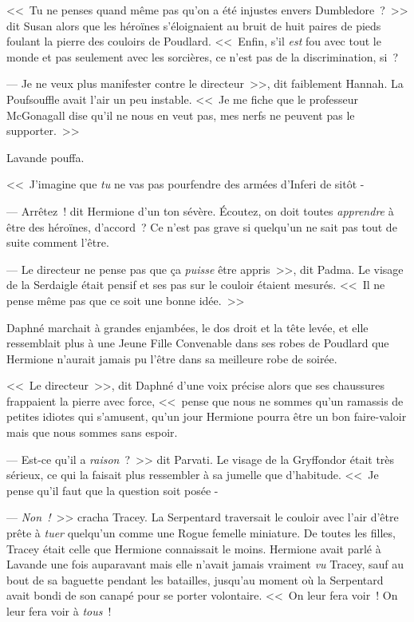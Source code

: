 <<~Tu ne penses quand même pas qu'on a été injustes envers Dumbledore~?~>> dit Susan alors que les héroïnes s'éloignaient au bruit de huit paires de pieds foulant la pierre des couloirs de Poudlard. <<~Enfin, s'il \emph{est} fou avec tout le monde et pas seulement avec les sorcières, ce n'est pas de la discrimination, si~?

--- Je ne veux plus manifester contre le directeur~>>, dit faiblement Hannah. La Poufsouffle avait l'air un peu instable. <<~Je me fiche que le professeur McGonagall dise qu'il ne nous en veut pas, mes nerfs ne peuvent pas le supporter.~>>

Lavande pouffa.

<<~J'imagine que \emph{tu} ne vas pas pourfendre des armées d'Inferi de sitôt -

--- Arrêtez~! dit Hermione d'un ton sévère. Écoutez, on doit toutes \emph{apprendre} à être des héroïnes, d'accord~? Ce n'est pas grave si quelqu'un ne sait pas tout de suite comment l'être.

--- Le directeur ne pense pas que ça \emph{puisse} être appris~>>, dit Padma. Le visage de la Serdaigle était pensif et ses pas sur le couloir étaient mesurés. <<~Il ne pense même pas que ce soit une bonne idée.~>>

Daphné marchait à grandes enjambées, le dos droit et la tête levée, et elle ressemblait plus à une Jeune Fille Convenable dans ses robes de Poudlard que Hermione n'aurait jamais pu l'être dans sa meilleure robe de soirée.

<<~Le directeur~>>, dit Daphné d'une voix précise alors que ses chaussures frappaient la pierre avec force, <<~pense que nous ne sommes qu'un ramassis de petites idiotes qui s'amusent, qu'un jour Hermione pourra être un bon faire-valoir mais que nous sommes sans espoir.

--- Est-ce qu'il a \emph{raison}~?~>> dit Parvati. Le visage de la Gryffondor était très sérieux, ce qui la faisait plus ressembler à sa jumelle que d'habitude. <<~Je pense qu'il faut que la question soit posée -

--- \emph{Non~!}~>> cracha Tracey. La Serpentard traversait le couloir avec l'air d'être prête à \emph{tuer} quelqu'un comme une Rogue femelle miniature. De toutes les filles, Tracey était celle que Hermione connaissait le moins. Hermione avait parlé à Lavande une fois auparavant mais elle n'avait jamais vraiment \emph{vu} Tracey, sauf au bout de sa baguette pendant les batailles, jusqu'au moment où la Serpentard avait bondi de son canapé pour se porter volontaire. <<~On leur fera voir~! On leur fera voir à \emph{tous}~!

